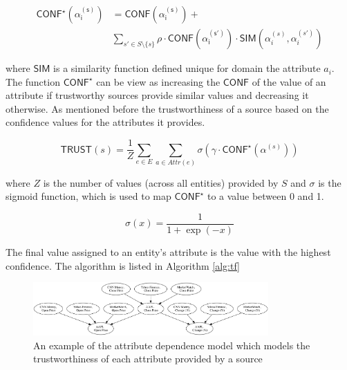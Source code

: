 \documentclass{acm_proc_article-sp}
\begin{document}
\begin{align}
\mathsf{CONF^\star(\alpha_i^{(s)})} &= \mathsf{CONF(\alpha_i^{(s)})} + \\ \nonumber
&  \sum_{s' \in S \setminus \{s\}} \rho \cdot \mathsf{CONF(\alpha_i^{(s')})}  \cdot \mathsf{SIM}(\alpha_i^{(s)},\alpha_i^{(s')})
\end{align}

where $\mathsf{SIM}$ is a similarity function defined unique for domain the attribute $a_i$. The function $\mathsf{CONF}^\star$ can be view as increasing  the $\mathsf{CONF}$ of the value of an attribute if trustworthy sources provide similar values and decreasing it otherwise. As mentioned before the trustworthiness of a source based on the confidence values for the attributes it provides. 

\begin{equation}
\mathsf{TRUST}(s) = \frac{1}{Z} \sum_{e \in E}\sum_{a \in Attr(e)} \sigma(\gamma \cdot \mathsf{CONF}^\star(\alpha^{(s)}))
\end{equation}

where $Z$ is the number of values (across all entities) provided by $S$ and $\sigma$ is the sigmoid function, which is used to map $\mathsf{CONF}^\star$ to a value between 0 and 1.

\begin{equation}
\sigma(x) = \frac{1}{1 + \exp{(-x)}}
\end{equation}

The final value assigned to an entity's attribute is the value with the highest confidence. The algorithm is listed in Algorithm \ref{alg:tf} 


\begin{figure}
\centering
\includegraphics[width=9cm]{bn2.png}
\caption{An example of the attribute dependence model which models the trustworthiness of each attribute provided by a source}
\end{figure}
\end{document}
